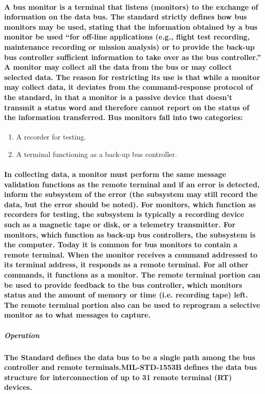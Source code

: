 \documentclass[12pt,a4paper]{report}
\begin{document}
\paragraph{\textrm{\textmd{A bus monitor is a terminal that listens (monitors) to the exchange of
information on the data bus. The standard strictly defines how bus
monitors may be used, stating that the information obtained by a bus
monitor be used “for off-line applications (e.g., flight test recording,
maintenance recording or mission analysis) or to provide the back-up bus
controller sufficient information to take over as the bus controller.” A
monitor may collect all the data from the bus or may collect selected data.
The reason for restricting its use is that while a monitor may collect data, it
deviates from the command-response protocol of the standard, in that a
monitor is a passive device that doesn’t transmit a status word and
therefore cannot report on the status of the information transferred. Bus
monitors fall into two categories:}}}
\begin{enumerate}
	\item A recorder for testing.
	\item A terminal functioning as a back-up bus controller.
\end{enumerate} 
\paragraph{\textrm{\textmd{In collecting data, a monitor must perform the same message validation
functions as the remote terminal and if an error is detected, inform the
subsystem of the error (the subsystem may still record the data, but the
error should be noted). For monitors, which function as recorders for
testing, the subsystem is typically a recording device such as a magnetic
tape or disk, or a telemetry transmitter. For monitors, which function as
back-up bus controllers, the subsystem is the computer.
Today it is common for bus monitors to contain a remote terminal. When
the monitor receives a command addressed to its terminal address, it
responds as a remote terminal. For all other commands, it functions as a
monitor. The remote terminal portion can be used to provide feedback to
the bus controller, which monitors status and the amount of memory or
time (i.e. recording tape) left. The remote terminal portion also can be
used to reprogram a selective monitor as to what messages to capture.}}}
\subparagraph{Operation}
\paragraph{\textrm{\textmd{The Standard defines the data bus to be a single path among the bus controller and remote terminals.MIL-STD-1553B defines the data bus structure for interconnection of up to 31 remote terminal (RT) devices.}}}
\end{document}
